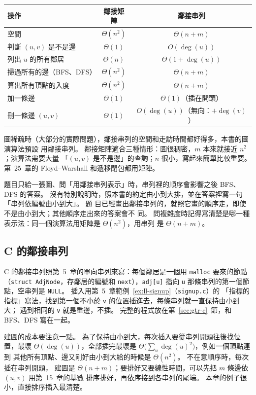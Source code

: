 \begin{center}
\begin{tabular}{lcc}
\toprule
操作 & 鄰接矩陣 & 鄰接串列 \\
\midrule
空間 & $\Theta(n^2)$ & $\Theta(n + m)$ \\
判斷 $(u, v)$ 是不是邊 & $\Theta(1)$ & $O(\deg(u))$ \\
列出 $u$ 的所有鄰居 & $\Theta(n)$ & $\Theta(1 + \deg(u))$ \\
掃過所有的邊（BFS、DFS）& $\Theta(n^2)$ & $\Theta(n + m)$ \\
算出所有頂點的入度 & $\Theta(n^2)$ & $\Theta(n + m)$ \\
加一條邊 & $\Theta(1)$ & $\Theta(1)$（插在開頭）\\
刪一條邊 $(u, v)$ & $\Theta(1)$ & $O(\deg(u))$（無向：$+\deg(v)$）\\
\bottomrule
\end{tabular}
\end{center}

圖稀疏時（大部分的實際問題），鄰接串列的空間和走訪時間都好得多，本書的圖演算法預設
用鄰接串列。 鄰接矩陣適合三種情形：圖很稠密，$m$ 本來就接近 $n^2$；演算法需要大量
「$(u, v)$ 是不是邊」的查詢；$n$ 很小，寫起來簡單比較重要。 第~25~章的 Floyd--Warshall
和遞移閉包都用矩陣。

\begin{examnote}
題目只給一張圖、問「用鄰接串列表示」時，串列裡的順序會影響之後 BFS、DFS 的答案。
沒有特別說明時，照本書的約定由小到大排，並在答案裡寫一句「串列依編號由小到大」。 題
目已經畫出鄰接串列的，就照它畫的順序走，即使不是由小到大；其他順序走出來的答案會不
同。 問複雜度時記得寫清楚是哪一種表示法：同一個演算法用矩陣是 $\Theta(n^2)$，用串列
是 $\Theta(n + m)$。
\end{examnote}

\subsection{C 的鄰接串列}

C 的鄰接串列照第~5~章的單向串列來寫：每個鄰居是一個用 \texttt{malloc} 要來的節點
（\texttt{struct AdjNode}，存鄰居的編號和 \texttt{next}），\texttt{adj[u]} 指向 \texttt{u}
那條串列的第一個節點，空串列是 \texttt{NULL}。 插入用第~5~章範例~\ref{ex:ll-signup}（\texttt{signup.c}）的
「指標的指標」寫法，找到第一個不小於 \texttt{v} 的位置插進去，每條串列就一直保持由小到大；
遇到相同的 \texttt{v} 就是重邊，不插。 完整的程式放在第~\ref{sec:gtr-c}~節，和 BFS、DFS
寫在一起。

建圖的成本要注意一點。 為了保持由小到大，每次插入要從串列開頭往後找位置，最壞
$\Theta(\deg(u))$，全部插完最壞是 $\Theta\bigl(\sum_u \deg(u)^2\bigr)$，例如一個頂點連到
其他所有頂點、邊又剛好由小到大給的時候是 $\Theta(n^2)$。 不在意順序時，每次插在串列開頭，
建圖是 $\Theta(n + m)$；要排好又要線性時間，可以先把 $m$ 條邊依 $(u, v)$ 用第~15~章的基數
排序排好，再依序接到各串列的尾端。 本章的例子很小，直接排序插入最清楚。

